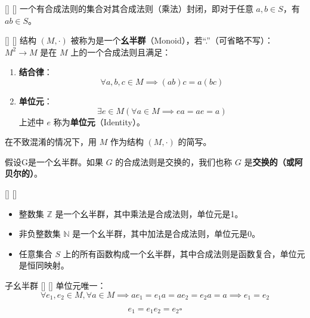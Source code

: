 \documentclass[UTF8]{ctexart}
\begin{document}
		\begin{ppt}
            []
            {}
            []
            []
			一个有合成法则的集合对其合成法则（乘法）封闭，即对于任意 \( a, b \in S \)，有 \( ab \in S \)。
		\end{ppt}

		\begin{dfn}
            []
            {}
            []
            []
			结构 \( (M, \cdot) \) 被称为是一个\textbf{幺半群}（Monoid），若“.”（可省略不写）：\( M^2 \to M \) 是在 \( M \) 上的一个合成法则且满足：
			\begin{enumerate}
			\item \textbf{结合律}：
				\[
				\forall a, b, c \in M \implies (ab)c = a(bc)
				\]
			\item \textbf{单位元}：
				\[
				\exists e \in M (\forall a \in M \implies ea = ae = a)
				\]
				上述中 \( e \) 称为\textbf{单位元}（Identity）。
			\end{enumerate}

			在不致混淆的情况下，用 \( M \) 作为结构 \( (M, \cdot) \) 的简写。
			
			假设G是一个幺半群。如果 \( G \) 的合成法则是交换的，我们也称 \( G \) 是\textbf{交换的（或阿贝尔的）}。
		\end{dfn}

		\begin{xmp}
            []
            {}
            []
            []
			\hspace{1cm}
			\begin{itemize}
				\item 整数集 \( \mathbb{Z} \) 是一个幺半群，其中乘法是合成法则，单位元是1。
				\item 非负整数集 \( \mathbb{N} \) 是一个幺半群，其中加法是合成法则，单位元是0。
				\item 任意集合 \( S \) 上的所有函数构成一个幺半群，其中合成法则是函数复合，单位元是恒同映射。
			\end{itemize}
		\end{xmp}

		\begin{ppt}
            []
            {子幺半群}
            []
            []
			单位元唯一：
			\[
			\forall e_1, e_2 \in M, \forall a \in M \implies ae_1=e_1 a=ae_2=e_2 a=a\implies e_1 = e_2
			\]
		\end{ppt}

		\begin{prf}
			\[
			e_1 = e_1 e_2 = e_2 \square
			\]
		\end{prf}
\end{document}
